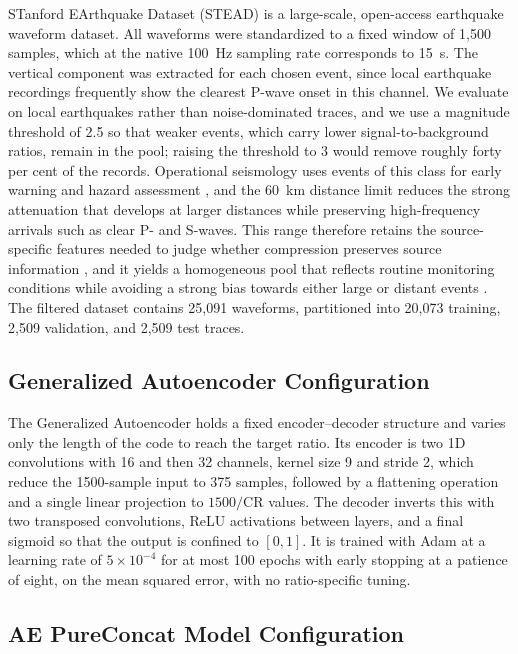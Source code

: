 \documentclass[fleqn,10pt]{wlscirep}
\begin{document}
STanford EArthquake Dataset (STEAD) \cite{mousavi2019stanford} is a large-scale, open-access earthquake waveform dataset. All waveforms were standardized to a fixed window of 1,500 samples, which at the native 100~Hz sampling rate corresponds to 15~s. The vertical component was extracted for each chosen event, since local earthquake recordings frequently show the clearest P-wave onset in this channel. We evaluate on local earthquakes rather than noise-dominated traces, and we use a magnitude threshold of 2.5 so that weaker events, which carry lower signal-to-background ratios, remain in the pool; raising the threshold to 3 would remove roughly forty per cent of the records. Operational seismology uses events of this class for early warning and hazard assessment \cite{cauzzi2018shakemap}, and the 60~km distance limit reduces the strong attenuation that develops at larger distances while preserving high-frequency arrivals such as clear P- and S-waves. This range therefore retains the source-specific features needed to judge whether compression preserves source information \cite{aki2002quantitative}, and it yields a homogeneous pool that reflects routine monitoring conditions while avoiding a strong bias towards either large or distant events \cite{mousavi2020earthquake}. The filtered dataset contains 25,091 waveforms, partitioned into 20,073 training, 2,509 validation, and 2,509 test traces.

\subsection{Generalized Autoencoder Configuration}
\label{subsec:genae}

The Generalized Autoencoder \cite{Helal2025} holds a fixed encoder--decoder structure and varies only the length of the code to reach the target ratio. Its encoder is two 1D convolutions with 16 and then 32 channels, kernel size 9 and stride 2, which reduce the 1500-sample input to 375 samples, followed by a flattening operation and a single linear projection to $1500/\mathrm{CR}$ values. The decoder inverts this with two transposed convolutions, ReLU activations between layers, and a final sigmoid so that the output is confined to $[0,1]$. It is trained with Adam at a learning rate of $5\times10^{-4}$ for at most 100 epochs with early stopping at a patience of eight, on the mean squared error, with no ratio-specific tuning.

\subsection{AE PureConcat Model Configuration}
\label{subsec:aepure}
\end{document}
